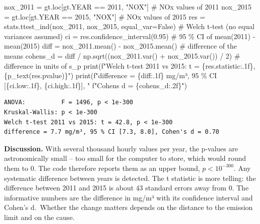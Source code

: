 \documentclass[
  letterpaper,
  DIV=11,
  numbers=noendperiod]{scrreprt}
\newenvironment{Shaded}{\begin{snugshade}}{\end{snugshade}}
\newcommand{\BuiltInTok}[1]{\textcolor[rgb]{0.00,0.23,0.31}{#1}}
\newcommand{\CommentTok}[1]{\textcolor[rgb]{0.37,0.37,0.37}{#1}}
\newcommand{\DecValTok}[1]{\textcolor[rgb]{0.68,0.00,0.00}{#1}}
\newcommand{\FloatTok}[1]{\textcolor[rgb]{0.68,0.00,0.00}{#1}}
\newcommand{\NormalTok}[1]{\textcolor[rgb]{0.00,0.23,0.31}{#1}}
\newcommand{\OperatorTok}[1]{\textcolor[rgb]{0.37,0.37,0.37}{#1}}
\newcommand{\SpecialCharTok}[1]{\textcolor[rgb]{0.37,0.37,0.37}{#1}}
\newcommand{\SpecialStringTok}[1]{\textcolor[rgb]{0.13,0.47,0.30}{#1}}
\newcommand{\StringTok}[1]{\textcolor[rgb]{0.13,0.47,0.30}{#1}}
\newcommand{\VariableTok}[1]{\textcolor[rgb]{0.07,0.07,0.07}{#1}}
\begin{document}
\begin{Shaded}
\begin{Highlighting}[]
\NormalTok{nox\_2011 }\OperatorTok{=}\NormalTok{ gt.loc[gt.YEAR }\OperatorTok{==} \DecValTok{2011}\NormalTok{, }\StringTok{"NOX"}\NormalTok{]                  }\CommentTok{\# NOx values of 2011}
\NormalTok{nox\_2015 }\OperatorTok{=}\NormalTok{ gt.loc[gt.YEAR }\OperatorTok{==} \DecValTok{2015}\NormalTok{, }\StringTok{"NOX"}\NormalTok{]                  }\CommentTok{\# NOx values of 2015}
\NormalTok{res }\OperatorTok{=}\NormalTok{ stats.ttest\_ind(nox\_2011, nox\_2015, equal\_var}\OperatorTok{=}\VariableTok{False}\NormalTok{) }\CommentTok{\# Welch t{-}test (no equal variances assumed)}
\NormalTok{ci }\OperatorTok{=}\NormalTok{ res.confidence\_interval(}\FloatTok{0.95}\NormalTok{)                         }\CommentTok{\# 95 \% CI of mean(2011) {-} mean(2015)}
\NormalTok{diff }\OperatorTok{=}\NormalTok{ nox\_2011.mean() }\OperatorTok{{-}}\NormalTok{ nox\_2015.mean()                   }\CommentTok{\# difference of the means}
\NormalTok{cohens\_d }\OperatorTok{=}\NormalTok{ diff }\OperatorTok{/}\NormalTok{ np.sqrt((nox\_2011.var() }\OperatorTok{+}\NormalTok{ nox\_2015.var()) }\OperatorTok{/} \DecValTok{2}\NormalTok{)  }\CommentTok{\# difference in units of s\_p}
\BuiltInTok{print}\NormalTok{(}\SpecialStringTok{f"Welch t{-}test 2011 vs 2015: t = }\SpecialCharTok{\{}\NormalTok{res}\SpecialCharTok{.}\NormalTok{statistic}\SpecialCharTok{:.1f\}}\SpecialStringTok{, }\SpecialCharTok{\{}\NormalTok{p\_text(res.pvalue)}\SpecialCharTok{\}}\SpecialStringTok{"}\NormalTok{)}
\BuiltInTok{print}\NormalTok{(}\SpecialStringTok{f"difference = }\SpecialCharTok{\{}\NormalTok{diff}\SpecialCharTok{:.1f\}}\SpecialStringTok{ mg/m³, 95 \% CI [}\SpecialCharTok{\{}\NormalTok{ci}\SpecialCharTok{.}\NormalTok{low}\SpecialCharTok{:.1f\}}\SpecialStringTok{, }\SpecialCharTok{\{}\NormalTok{ci}\SpecialCharTok{.}\NormalTok{high}\SpecialCharTok{:.1f\}}\SpecialStringTok{], "}
      \SpecialStringTok{f"Cohen\textquotesingle{}s d = }\SpecialCharTok{\{}\NormalTok{cohens\_d}\SpecialCharTok{:.2f\}}\SpecialStringTok{"}\NormalTok{)}
\end{Highlighting}
\end{Shaded}

\begin{verbatim}
ANOVA:          F = 1496, p < 1e-300
Kruskal-Wallis: p < 1e-300
Welch t-test 2011 vs 2015: t = 42.8, p < 1e-300
difference = 7.7 mg/m³, 95 % CI [7.3, 8.0], Cohen's d = 0.70
\end{verbatim}

\textbf{Discussion.} With several thousand hourly values per year, the
p-values are astronomically small -- too small for the computer to
store, which would round them to 0. The code therefore reports them as
an upper bound, \(p < 10^{-300}\). Any systematic difference between
years is detected. The t statistic is more telling: the difference
between 2011 and 2015 is about 43 standard errors away from 0. The
informative numbers are the difference in mg/m³ with its confidence
interval and Cohen's d.~Whether the change matters depends on the
distance to the emission limit and on the cause.
\end{document}
